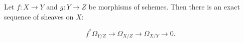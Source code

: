 Let $f: X \to Y$ and $g: Y \to Z$ be morphisms of schemes. Then there is an exact sequence of sheaves on $X$:

$$f^* \Omega_{Y/Z} \to \Omega_{X/Z} \to \Omega_{X/Y} \to 0.$$
